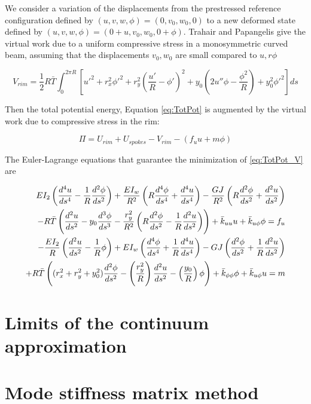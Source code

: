\documentclass[\rootdir/thesis.tex]{subfiles}
\begin{document}
We consider a variation of the displacements from the prestressed reference configuration defined by $(u,v,w,\phi)=(0,v_0,w_0,0)$ to a new deformed state defined by $(u,v,w,\phi)=(0+u,v_0,w_0,0+\phi)$. Trahair and Papangelis\cite{Trahair} give the virtual work due to a uniform compressive stress in a monosymmetric curved beam, assuming that the displacements $v_0,w_0$ are small compared to $u,r\phi$

\begin{equation}
\label{eq:V_rim}
V_{rim} = \frac{1}{2}R\bar{T} \int_0^{2\pi R}
    \left[u'^2 + r_x^2\phi'^2+r_y^2\left(\frac{u'}{R}-\phi'\right)^2
          +y_0\left(2u''\phi-\frac{\phi^2}{R}\right) + y_0^2\phi'^2 \right] ds
\end{equation}

Then the total potential energy, Equation \ref{eq:TotPot} is augmented by the virtual work due to compressive stress in the rim:

\begin{equation}
\label{eq:TotPot_V}
\Pi = U_{rim} + U_{spokes} - V_{rim} - (f_uu+m\phi)
\end{equation}

The Euler-Lagrange equations that guarantee the minimization of \eqref{eq:TotPot_V} are

\begin{subequations}
\label{eq:lat_ode_full}
\begin{align}
\begin{split}
  EI_2\left( \frac{d^4u}{ds^4} - \frac{1}{R}\frac{d^2\phi}{ds^2} \right)
  + \frac{EI_w}{R^2}\left( R\frac{d^4\phi}{ds^4} + \frac{d^4u}{ds^4} \right)
  - \frac{GJ}{R^2}\left( R\frac{d^2\phi}{ds^2} + \frac{d^2u}{ds^2} \right)\\
  - R\bar{T}\left( \frac{d^2u}{ds^2} - y_0\frac{d^3\phi}{ds^3}
                  -\frac{r_y^2}{R^2}\left(R\frac{d^2\phi}{ds^2}
                  -\frac{1}{R}\frac{d^2u}{ds^2}\right) \right)
  + \bar{k}_{uu} u + \bar{k}_{u\phi} \phi = f_u
\end{split}\\
\begin{split}
  - \frac{EI_2}{R}\left( \frac{d^2u}{ds^2} - \frac{1}{R}\phi \right)
  + EI_w\left( \frac{d^4\phi}{ds^4} + \frac{1}{R}\frac{d^4u}{ds^4} \right)
  - GJ\left( \frac{d^2\phi}{ds^2} + \frac{1}{R}\frac{d^2u}{ds^2} \right)\\
  + R\bar{T}\left((r_x^2+r_y^2+y_0^2)\frac{d^2\phi}{ds^2}
                  -\left(\frac{r_y^2}{R}\right)\frac{d^2u}{ds^2}
                  -\left(\frac{y_0}{R}\right)\phi\right)
  + \bar{k}_{\phi\phi} \phi + \bar{k}_{u\phi} u = m
\end{split}
\end{align}
\end{subequations}

\section{Limits of the continuum approximation}


\section{Mode stiffness matrix method}
\end{document}
